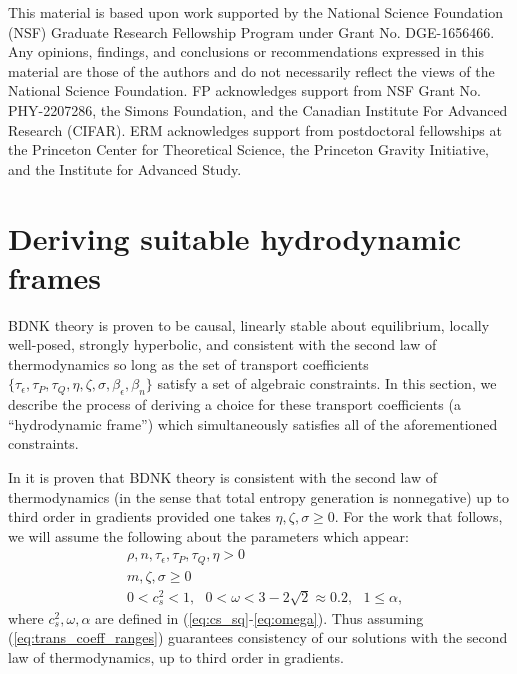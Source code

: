 \documentclass[%
notitlepage,
superscriptaddress,
nofootinbib,
amsmath,
amssymb,
aps,
twocolumn
]{revtex4-1}
\begin{document}
\begin{acknowledgments}
This material is based upon work supported by the National Science
Foundation (NSF) Graduate Research Fellowship Program under Grant No.
DGE-1656466. Any opinions, findings, and conclusions or recommendations
expressed in this material are those of the authors and do not necessarily
reflect the views of the National Science Foundation. FP acknowledges
support from NSF Grant No.  PHY-2207286, the Simons Foundation, and the
Canadian Institute For Advanced Research (CIFAR). ERM acknowledges support
from postdoctoral fellowships at the Princeton Center for Theoretical
Science, the Princeton Gravity Initiative, and the Institute for Advanced
Study.
\end{acknowledgments}

\appendix

\section{Deriving suitable hydrodynamic frames} \label{sec:hydro_frame}
BDNK theory is proven to be causal, linearly stable about equilibrium, locally well-posed, strongly hyperbolic, and consistent with the second law of thermodynamics so long as the set of transport coefficients $\{\tau_{\epsilon}, \tau_{P}, \tau_{Q}, \eta, \zeta, \sigma, \beta_{\epsilon}, \beta_{n}\}$ satisfy a set of algebraic constraints.  In this section, we describe the process of deriving a choice for these transport coefficients (a ``hydrodynamic frame'') which simultaneously satisfies all of the aforementioned constraints.

In \cite{Bemfica:2020zjp} it is proven that BDNK theory is consistent with the second law of thermodynamics (in the sense that total entropy generation is nonnegative) up to third order in gradients provided one takes $\eta, \zeta, \sigma \geq 0$.  For the work that follows, we will assume the following about the parameters which appear:
\begin{equation} \label{eq:trans_coeff_ranges}
\begin{aligned}
&\rho, n, \tau_{\epsilon}, \tau_{P}, \tau_{Q}, \eta > 0 \\ 
&m, \zeta, \sigma \geq 0 \\
&0 < c_s^2 < 1, ~~~ 0 < \omega < 3 - 2 \sqrt{2} \approx 0.2, ~~~ 1 \leq \alpha,
\end{aligned}
\end{equation}
where $c_s^2, \omega, \alpha$ are defined in (\ref{eq:cs_sq}-\ref{eq:omega}).  Thus assuming (\ref{eq:trans_coeff_ranges}) guarantees consistency of our solutions with the second law of thermodynamics, up to third order in gradients.
\end{document}
